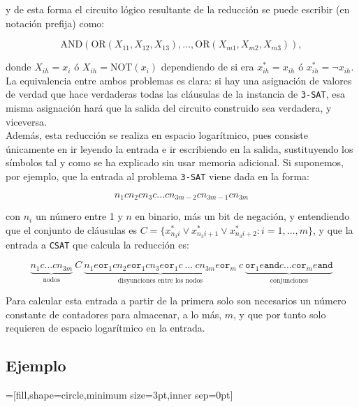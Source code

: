 \documentclass[11pt,a4paper]{article}
\newenvironment{sol}{\begin{adjustwidth}{1em}{}}{\end{adjustwidth}}
\begin{document}
\begin{sol}
y de esta forma el circuito lógico resultante de la reducción se puede escribir (en notación prefija) como:

\[
\text{AND}(\text{OR}(X_{11},X_{12},X_{13}), \dots, \text{OR}(X_{m1}, X_{m2}, X_{m3})),
\]

donde $X_{ih} = x_i$ ó $X_{ih} = \text{NOT}(x_i)$ dependiendo de si era $x^*_{ih} = x_{ih}$ ó $x_{ih}^* = \lnot x_{ih}$.\\

La equivalencia entre ambos problemas es clara: si hay una asignación de valores de verdad que hace verdaderas todas las cláusulas de la instancia de \verb|3-SAT|, esa misma asignación hará que la salida del circuito construido sea verdadera, y viceversa.\\

Además, esta reducción se realiza en espacio logarítmico, pues consiste únicamente en ir leyendo la entrada e ir escribiendo en la salida, sustituyendo los símbolos tal y como se ha explicado sin usar memoria adicional. Si suponemos, por ejemplo, que la entrada al problema \verb|3-SAT| viene dada en la forma:

\[
  n_{1} c n_{2} c n_{3} c \dots c n_{3m-2} c n_{3m-1} c n_{3m}
\]

con $n_{i}$ un número entre 1 y $n$ en binario, más un bit de negación, y entendiendo que el conjunto de cláusulas es $C = \{ x^*_{n_3i}\lor x^*_{n_3i+1} \lor x^*_{n_3i+2} : i=1,\dots,m \}$, y que la entrada a \verb|CSAT| que calcula la reducción es:

\[
  \underbrace{n_{1}c\dots cn_{3m}}_\text{nodos}\ C\ \underbrace{n_{1}e\texttt{or}_{1}cn_{2}e\texttt{or}_{1}cn_{3}e\texttt{or}_{1}c\ \dots\ cn_{3m}e\texttt{or}_{m}}_\text{disyunciones entre los nodos}\ c \ \underbrace{\texttt{or}_{1}e\texttt{and}c\dots c\texttt{or}_{m}e\texttt{and}}_\text{conjunciones}
\]

Para calcular esta entrada a partir de la primera solo son necesarios un número constante de contadores para almacenar, a lo más, $m$, y que por tanto solo requieren de espacio logarítmico en la entrada.

\subsection*{Ejemplo}



\vspace{2em}
\thispagestyle{empty}
=[fill,shape=circle,minimum size=3pt,inner sep=0pt]
\begin{center}
\begin{tikzpicture}[label distance=2mm]


\end{tikzpicture}
\end{center}
\end{sol}
\end{document}
